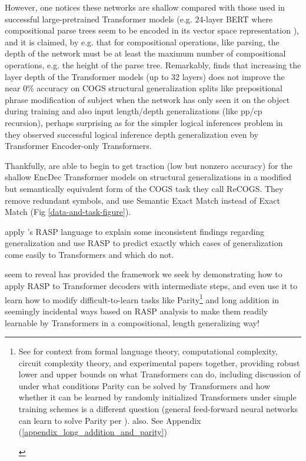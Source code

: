 \documentclass[11pt]{article}
\begin{document}
However, one notices these networks are shallow compared with those used in successful large-pretrained Transformer models (e.g. 24-layer BERT where compositional parse trees seem to be encoded in its vector space representation \cite{hewitt-manning-2019-structural}), and it is claimed, by e.g. \cite{Csordas2022} that for compositional operations, like parsing, the depth of the network must be at least the maximum number of compositional operations, e.g. the height of the parse tree. Remarkably, \cite{petty2024impactdepthcompositionalgeneralization} finds that increasing the layer depth of the Transformer models (up to 32 layers) does not improve the near 0\% accuracy on COGS structural generalization splits like prepositional phrase modification of subject when the network has only seen it on the object during training and also input length/depth generalizations (like pp/cp recursion), perhaps surprising as for the simpler logical inferences problem in \cite{Clark2020} they observed successful logical inference depth generalization even by Transformer Encoder-only Transformers.

Thankfully, \cite{Wu2023} are able to begin to get traction (low but nonzero accuracy) for the shallow EncDec Transformer models on structural generalizations in a modified but semantically equivalent form of the COGS task they call ReCOGS. They remove redundant symbols, and use Semantic Exact Match instead of Exact Match (Fig \ref{data-and-task-figure}).

\cite{Zhou2024} apply \cite{Weiss2021}'s RASP language to explain some inconsistent findings regarding generalization and use RASP to predict exactly which cases of generalization come easily to Transformers and which do not.

\cite{Zhou2024} seem to reveal \cite{Weiss2021} has provided the framework we seek by demonstrating how to apply RASP to Transformer decoders with intermediate steps, and even use it to learn how to modify difficult-to-learn tasks like Parity\footnote{\begin{footnotesize}See \cite{Strobl2024} for context from formal language theory, computational complexity, circuit complexity theory, and experimental papers together, providing robust lower and upper bounds on what Transformers can do, including discussion of under what conditions Parity can be solved by Transformers and how whether it can be learned by randomly initialized Transformers under simple training schemes is a different question (general feed-forward neural networks can learn to solve Parity per \cite{10.7551/mitpress/4943.003.0128}). \cite{delétang2023neuralnetworkschomskyhierarchy} also. See Appendix (\ref{appendix_long_addition_and_parity})\end{footnotesize}} and long addition in seemingly incidental ways based on RASP analysis to make them readily learnable by Transformers in a compositional, length generalizing way!
\end{document}
